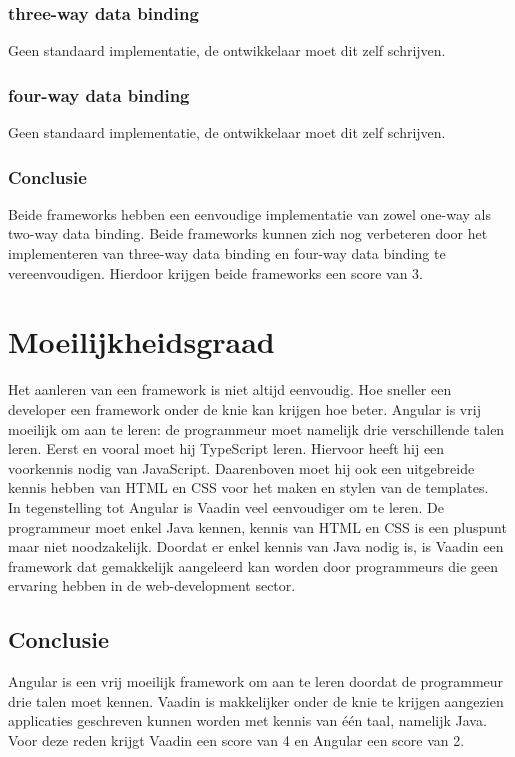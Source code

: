 \subsubsection{three-way data binding}
Geen standaard implementatie, de ontwikkelaar moet dit zelf schrijven.
\subsubsection{four-way data binding}
Geen standaard implementatie, de ontwikkelaar moet dit zelf schrijven.

\subsubsection{Conclusie}
Beide frameworks hebben een eenvoudige implementatie van zowel one-way als two-way data binding. Beide frameworks kunnen zich nog verbeteren door het implementeren van three-way data binding en four-way data binding te vereenvoudigen. Hierdoor krijgen beide frameworks een score van 3. 

\section{Moeilijkheidsgraad}
Het aanleren van een framework is niet altijd eenvoudig. Hoe sneller een developer een framework onder de knie kan krijgen hoe beter. 
Angular is vrij moeilijk om aan te leren: de programmeur moet namelijk drie verschillende talen leren.
Eerst en vooral moet hij TypeScript leren. Hiervoor heeft hij een voorkennis nodig van JavaScript. Daarenboven moet hij ook een uitgebreide kennis hebben van HTML en CSS voor het maken en stylen van de templates.
\\
In tegenstelling tot Angular is Vaadin veel eenvoudiger om te leren. De programmeur moet enkel Java kennen, kennis van HTML en CSS is een pluspunt maar niet noodzakelijk.
Doordat er enkel kennis van Java nodig is, is Vaadin een framework dat gemakkelijk aangeleerd kan worden door programmeurs die geen ervaring hebben in de web-development sector.

\subsection{Conclusie}
Angular is een vrij moeilijk framework om aan te leren doordat de programmeur drie talen moet kennen. Vaadin is makkelijker onder de knie te krijgen aangezien applicaties geschreven kunnen worden met kennis van één taal, namelijk Java. 
Voor deze reden krijgt Vaadin een score van 4 en Angular een score van 2.


